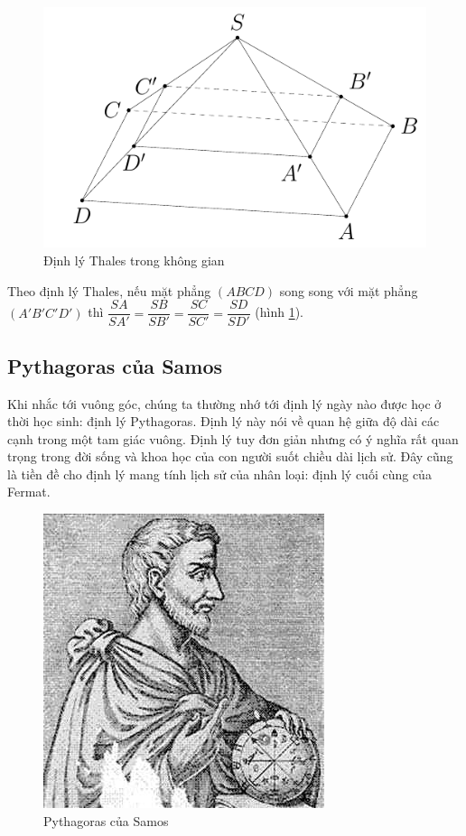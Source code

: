 \begin{figure}[ht]
	\centering
	\includegraphics{analytic_geometry/thales2.pdf}
	\caption{Định lý Thales trong không gian}
	\label{thales2}
\end{figure}

Theo định lý Thales, nếu mặt phẳng $(ABCD)$ song song với mặt phẳng $(A'B'C'D')$ thì $\dfrac{SA}{SA'} = \dfrac{SB}{SB'} = \dfrac{SC}{SC'} = \dfrac{SD}{SD'}$ (hình \ref{thales2}).

\subsection*{Pythagoras của Samos}

Khi nhắc tới vuông góc, chúng ta thường nhớ tới định lý ngày nào được học ở thời học sinh: định lý Pythagoras. Định lý này nói về quan hệ giữa độ dài các cạnh trong một tam giác vuông. Định lý tuy đơn giản nhưng có ý nghĩa rất quan trọng trong đời sống và khoa học của con người suốt chiều dài lịch sử. Đây cũng là tiền đề cho định lý mang tính lịch sử của nhân loại: định lý cuối cùng của Fermat.

\begin{figure}[ht]
	\centering
	\includegraphics[scale=0.5]{analytic_geometry/Pythagoras.jpeg}
	\caption{Pythagoras của Samos}
\end{figure}

